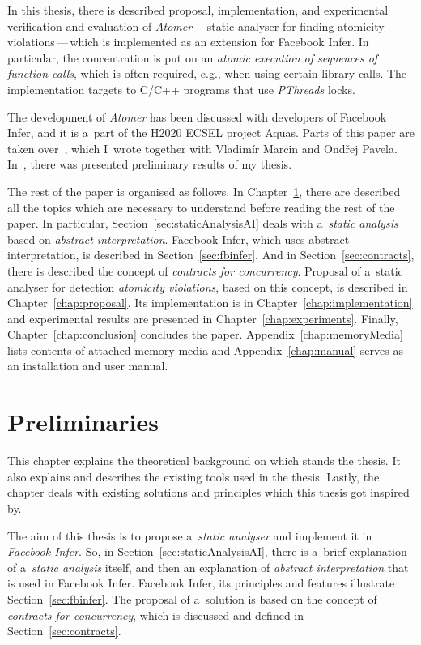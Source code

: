 In this thesis, there is described proposal, implementation, and experimental
verification and evaluation of \emph{Atomer}\,---\,static analyser for
finding atomicity violations\,---\,which is implemented as an extension for
Facebook Infer. In particular, the concentration is put on an
\emph{atomic execution of sequences of function calls}, which is often
required, e.g., when using certain library calls. The implementation targets
to C/C++ programs that use \emph{PThreads} locks.

The development of \emph{Atomer} has been discussed with developers of
Facebook Infer, and it is a~part of the H2020 ECSEL project Aquas. Parts
of this paper are taken over~\cite{excel2019FBInfer}, which I~wrote
together with Vladimír Marcin and Ondřej Pavela. In~\cite{excel2019FBInfer},
there was presented preliminary results of my thesis.

The rest of the paper is organised as follows. In
Chapter~\ref{chap:preliminaries}, there are described all the topics
which are necessary to understand before reading the rest of the paper. In
particular, Section~\ref{sec:staticAnalysisAI} deals with
a~\emph{static analysis} based on \emph{abstract interpretation}.
Facebook Infer, which uses abstract interpretation, is described in
Section~\ref{sec:fbinfer}. And in Section~\ref{sec:contracts}, there is
described the concept of \emph{contracts for concurrency}. Proposal of a~static
analyser for detection \emph{atomicity violations}, based on this concept, is
described in Chapter~\ref{chap:proposal}. Its implementation is in
Chapter~\ref{chap:implementation} and experimental results are presented
in Chapter~\ref{chap:experiments}. Finally, Chapter~\ref{chap:conclusion}
concludes the paper. Appendix~\ref{chap:memoryMedia} lists contents
of attached memory media and Appendix~\ref{chap:manual} serves as an
installation and user manual.



\chapter{Preliminaries}
\label{chap:preliminaries}

This chapter explains the theoretical background on which stands the
thesis. It also explains and describes the existing tools used in the
thesis. Lastly, the chapter deals with existing solutions and principles
which this thesis got inspired by.

The aim of this thesis is to propose a~\emph{static analyser} and implement
it in \emph{Facebook Infer}. So, in Section~\ref{sec:staticAnalysisAI},
there is a~brief explanation of a~\emph{static analysis} itself, and then an
explanation of \emph{abstract interpretation} that is used in Facebook Infer.
Facebook Infer, its principles and features illustrate
Section~\ref{sec:fbinfer}. The proposal of a~solution is based on the
concept of \emph{contracts for concurrency}, which is discussed and defined
in Section~\ref{sec:contracts}.


